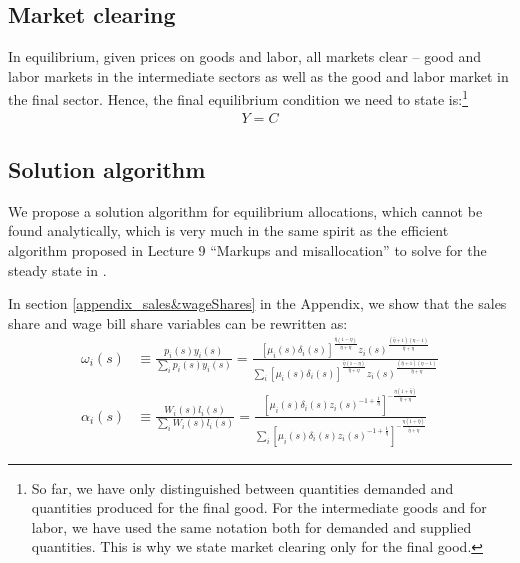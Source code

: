 \documentclass[12pt]{article}%
\begin{document}
\subsection{Market clearing}
In equilibrium, given prices on goods and labor, all markets clear -- good and labor markets in the intermediate sectors as well as the good and labor market in the final sector. Hence, the final equilibrium condition we need to state is:\footnote{So far, we have only distinguished between quantities demanded and quantities produced for the final good. For the intermediate goods and for labor, we have used the same notation both for demanded and supplied quantities. This is why we state market clearing only for the final good. }
\begin{align*}
    Y = C
\end{align*}



\subsection{Solution algorithm} \label{section_solutionAlgo}
We propose a solution algorithm for equilibrium allocations, which cannot be found analytically, which is very much in the same spirit as the efficient algorithm proposed in Lecture 9 ``Markups and misallocation'' to solve for the steady state in \citet{Atkeson-Burstein_2008}. 

In section \ref{appendix_sales&wageShares} in the Appendix, we show that the sales share and wage bill share variables can be rewritten as:
\begin{align}
    \omega_i(s) & \equiv \frac{p_i(s) y_i(s)}{\sum_i p_i(s) y_i(s)} = \frac{ [\mu_i(s)\delta_i(s)]^{\frac{\hat{\eta} (1 - \eta)}{\hat{\eta} + \eta}} z_i(s)^{\frac{(\hat{\eta} + 1)(\eta - 1)}{\hat{\eta} + \eta}} }{ \sum_i [\mu_i(s)\delta_i(s)]^{\frac{\hat{\eta} (1 - \eta)}{\hat{\eta} + \eta}} z_i(s)^{\frac{(\hat{\eta} + 1)(\eta - 1)}{\hat{\eta} + \eta}} }
    \label{sales_share} \\
    \alpha_i(s) & \equiv \frac{W_i(s)l_i(s)}{\sum_i W_i(s) l_i(s)} = \frac{ [ \mu_i(s) \delta_i(s) z_i(s)^{-1 + \frac{1}{\eta}} ]^{-\frac{\eta(1+\hat{\eta})}{\hat{\eta} + \eta}} }{ \sum_i [\mu_i(s) \delta_i(s) z_i(s)^{-1 + \frac{1}{\eta}}]^{-\frac{\eta(1+\hat{\eta})}{\hat{\eta} + \eta}} }
    \label{wage_bill_shares}
\end{align}
\end{document}
